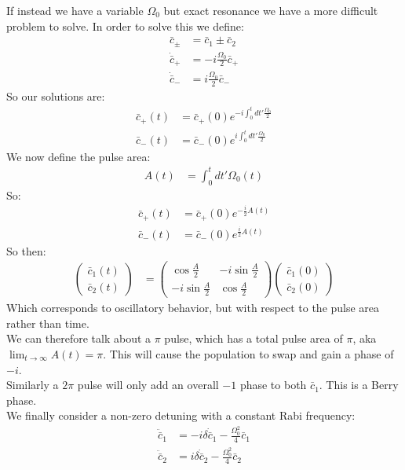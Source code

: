If instead we have a variable $\Omega_0$ but exact resonance we have a more difficult problem to solve. In order to solve this we define:
\begin{align*}
	\bar{c}_\pm &= \bar{c}_1 \pm \bar{c}_2 \\
	\dot{\bar{c}}_+ &= -i\frac{\Omega_0}{2} \bar{c}_+ \\
	\dot{\bar{c}}_- &= i\frac{\Omega_0}{2} \bar{c}_-
\end{align*}
So our solutions are:
\begin{align*}
	\bar{c}_+(t) &= \bar{c}_+(0) e^{-i\int_0^t dt' \frac{\Omega_0}{2}} \\
	\bar{c}_-(t) &= \bar{c}_-(0) e^{i\int_0^t dt' \frac{\Omega_0}{2}}
\end{align*}
We now define the pulse area:
\begin{align*}
	A(t) &= \int_0^t dt' \Omega_0(t)
\end{align*}
So:
\begin{align*}
	\bar{c}_+(t) &= \bar{c}_+(0) e^{-\frac{i}{2}A(t)} \\
	\bar{c}_-(t) &= \bar{c}_-(0) e^{\frac{i}{2}A(t)}
\end{align*}
So then:
\begin{align*}
	\begin{pmatrix}
		\bar{c}_1(t) \\
		\bar{c}_2(t)
	\end{pmatrix} &= \begin{pmatrix}
	\cos\frac{A}{2} & -i\sin\frac{A}{2} \\
	-i\sin\frac{A}{2} & \cos\frac{A}{2}
		  \end{pmatrix}
		  \begin{pmatrix}
			  \bar{c}_1(0) \\
			  \bar{c}_2(0)
    \end{pmatrix}
\end{align*}
Which corresponds to oscillatory behavior, but with respect to the pulse area rather than time.\\
We can therefore talk about a $\pi$ pulse, which has a total pulse area of $\pi$, aka $\lim_{t\to\infty} A(t) = \pi$. This will cause the population to swap and gain a phase of $-i$.\\
Similarly a $2\pi$ pulse will only add an overall $-1$ phase to both $\bar{c}_1$. This is a Berry phase. \\
We finally consider a non-zero detuning with a constant Rabi frequency:
\begin{align*}
	\ddot{\bar{c}}_1 &= -i\delta\dot{\bar{c}}_1  - \frac{\Omega_0^2}{4} \bar{c}_1 \\
\ddot{\bar{c}}_2 &= i\delta\dot{\bar{c}}_2  - \frac{\Omega_0^2}{4} \bar{c}_2
\end{align*}
